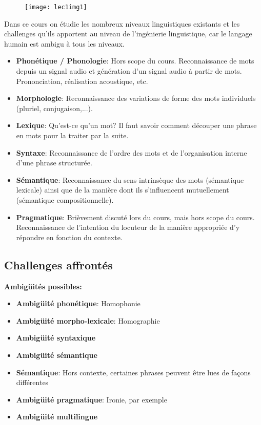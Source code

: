 \begin{figure}[H]
\centering
\texttt{[image: lec1img1]}
\end{figure}

Dans ce cours on étudie les nombreux niveaux linguistiques existants et les challenges qu'ils apportent au niveau
de l'ingénierie linguistique, car le langage humain est ambigu à tous les niveaux.\\

\begin{itemize}
    \item \textbf{Phonétique / Phonologie}: Hors scope du cours. Reconnaissance de mots depuis un signal audio et
    génération d'un signal audio à partir de mots. Prononciation, réalisation acoustique, etc.
    \item \textbf{Morphologie}: Reconnaissance des variations de forme des mots individuels (pluriel, conjugaison,...).
    \item \textbf{Lexique}: Qu'est-ce qu'un mot? Il faut savoir comment découper une phrase en mots pour la traiter par la suite.
    \item \textbf{Syntaxe}: Reconnaissance de l'ordre des mots et de l'organisation interne d'une phrase structurée.
    \item \textbf{Sémantique}: Reconnaissance du sens intrinsèque des mots (sémantique lexicale) ainsi que de la manière dont
    ils s'influencent mutuellement (sémantique compositionnelle).
    \item \textbf{Pragmatique}: Brièvement discuté lors du cours, mais hors scope du cours. Reconnaissance de l'intention du
    locuteur de la manière appropriée d'y répondre en fonction du contexte.
\end{itemize}

\subsection{Challenges affrontés}

\textbf{Ambigüités possibles:}

\begin{itemize}
    \item \textbf{Ambigüité phonétique}: Homophonie
    \item \textbf{Ambigüité morpho-lexicale}: Homographie
    \item \textbf{Ambigüité syntaxique}
    \item \textbf{Ambigüité sémantique}
    \item \textbf{Sémantique}: Hors contexte, certaines phrases peuvent être lues de façons différentes
    \item \textbf{Ambigüité pragmatique}: Ironie, par exemple
    \item \textbf{Ambigüité multilingue}
\end{itemize}

